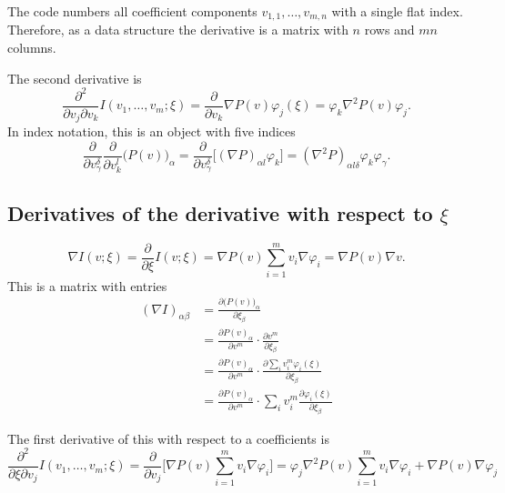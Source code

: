 \documentclass[a4paper]{article}
\begin{document}
The code numbers all coefficient components $v_{1,1},\dots,v_{m,n}$ with a single
flat index. Therefore, as a data structure the derivative is a matrix
with $n$ rows and $mn$ columns.

\bigskip

The second derivative is
\begin{equation*}
 \frac{\partial^2}{\partial v_j \partial v_k} I(v_1,\dots,v_m;\xi)
 =
 \frac{\partial}{\partial v_k} \nabla P(v) \varphi_j (\xi)
 =
 \varphi_k \nabla^2 P(v) \varphi_j.
\end{equation*}
In index notation, this is an object with five indices
\begin{equation*}
 \frac{\partial}{\partial v_\gamma^\delta} \frac{\partial}{\partial v_k^l} \big(P(v)\big)_\alpha
 =
 \frac{\partial}{\partial v_\gamma^\delta} \Big[ (\nabla P)_{\alpha l} \varphi_k \Big]
 =
 (\nabla^2 P)_{\alpha l \delta} \varphi_k \varphi_\gamma.
\end{equation*}



\subsection{Derivatives of the derivative with respect to $\xi$}

\begin{equation*}
 \nabla I(v;\xi)
 =
 \frac{\partial}{\partial \xi} I(v;\xi)
 =
 \nabla P(v) \sum_{i=1}^m v_i \nabla \varphi_i
 =
 \nabla P(v) \nabla v.
\end{equation*}
This is a matrix with entries
\begin{align*}
 (\nabla I)_{\alpha \beta}
 & =
 \frac{\partial \big(P(v)\big)_\alpha}{\partial \xi_\beta}
 \\
 & =
 \frac{\partial P(v)_\alpha}{\partial v^m} \cdot \frac{\partial v^m}{\partial \xi_\beta}
 \\
 & =
 \frac{\partial P(v)_\alpha}{\partial v^m} \cdot \frac{\partial \sum_i v_i^m \varphi_i(\xi)}{\partial \xi_\beta}
 \\
 & =
 \frac{\partial P(v)_\alpha}{\partial v^m} \cdot \sum_i v_i^m \frac{\partial \varphi_i(\xi)}{\partial \xi_\beta}
\end{align*}



The first derivative of this with respect to a coefficients is
\begin{equation*}
 \frac{\partial^2}{\partial \xi \partial v_j} I(v_1,\dots,v_m;\xi)
 =
 \frac{\partial}{\partial v_j} \Big[ \nabla P(v) \sum_{i=1}^m v_i \nabla \varphi_i \Big]
 =
 \varphi_j \nabla^2P(v) \sum_{i=1}^m v_i \nabla \varphi_i + \nabla P(v) \nabla \varphi_j
\end{equation*}
\end{document}

